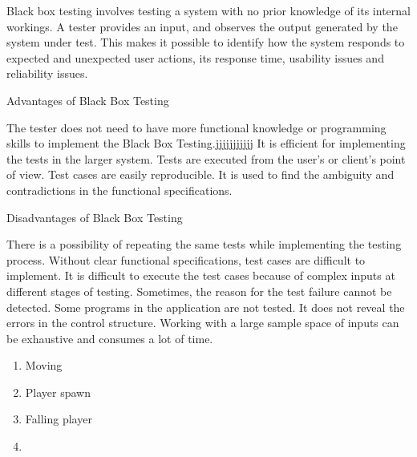 \documentclass{article}
\begin{document}
Black box testing involves testing a system with no prior knowledge of its internal workings. A tester provides an input, and observes the output generated by the system under test. This makes it possible to identify how the system responds to expected and unexpected user actions, its response time, usability issues and reliability issues.

Advantages of Black Box Testing

The tester does not need to have more functional knowledge or programming skills to implement the Black Box Testing.jjjjjjjjjjj
It is efficient for implementing the tests in the larger system.
Tests are executed from the user’s or client’s point of view.
Test cases are easily reproducible.
It is used to find the ambiguity and contradictions in the functional specifications.

Disadvantages of Black Box Testing

There is a possibility of repeating the same tests while implementing the testing process.
Without clear functional specifications, test cases are difficult to implement.
It is difficult to execute the test cases because of complex inputs at different stages of testing.
Sometimes, the reason for the test failure cannot be detected.
Some programs in the application are not tested.
It does not reveal the errors in the control structure.
Working with a large sample space of inputs can be exhaustive and consumes a lot of time.


\begin{enumerate}
	\item Moving
	\item Player spawn
	\item Falling player
	\item 
\end{enumerate}
\end{document}
